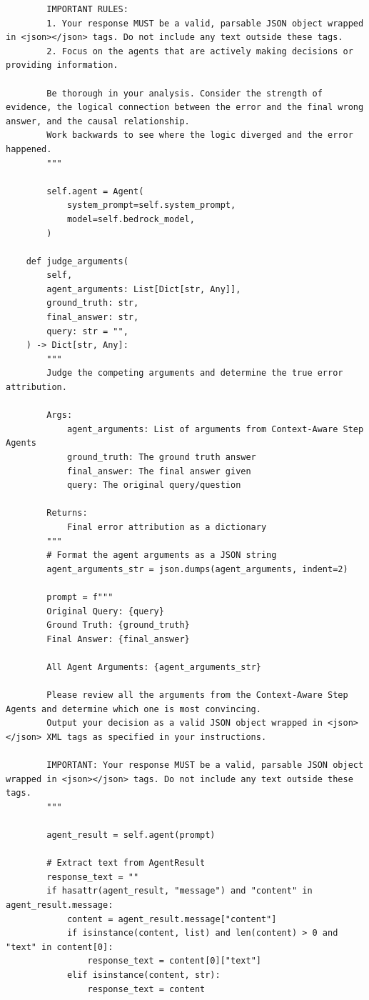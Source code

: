 \documentclass{article}
\begin{document}
\begin{lstlisting}
        IMPORTANT RULES:
        1. Your response MUST be a valid, parsable JSON object wrapped in <json></json> tags. Do not include any text outside these tags.
        2. Focus on the agents that are actively making decisions or providing information.
        
        Be thorough in your analysis. Consider the strength of evidence, the logical connection between the error and the final wrong answer, and the causal relationship.
        Work backwards to see where the logic diverged and the error happened.
        """

        self.agent = Agent(
            system_prompt=self.system_prompt,
            model=self.bedrock_model,
        )

    def judge_arguments(
        self,
        agent_arguments: List[Dict[str, Any]],
        ground_truth: str,
        final_answer: str,
        query: str = "",
    ) -> Dict[str, Any]:
        """
        Judge the competing arguments and determine the true error attribution.

        Args:
            agent_arguments: List of arguments from Context-Aware Step Agents
            ground_truth: The ground truth answer
            final_answer: The final answer given
            query: The original query/question

        Returns:
            Final error attribution as a dictionary
        """
        # Format the agent arguments as a JSON string
        agent_arguments_str = json.dumps(agent_arguments, indent=2)

        prompt = f"""
        Original Query: {query}
        Ground Truth: {ground_truth}
        Final Answer: {final_answer}
        
        All Agent Arguments: {agent_arguments_str}
        
        Please review all the arguments from the Context-Aware Step Agents and determine which one is most convincing.
        Output your decision as a valid JSON object wrapped in <json></json> XML tags as specified in your instructions.
        
        IMPORTANT: Your response MUST be a valid, parsable JSON object wrapped in <json></json> tags. Do not include any text outside these tags.
        """

        agent_result = self.agent(prompt)

        # Extract text from AgentResult
        response_text = ""
        if hasattr(agent_result, "message") and "content" in agent_result.message:
            content = agent_result.message["content"]
            if isinstance(content, list) and len(content) > 0 and "text" in content[0]:
                response_text = content[0]["text"]
            elif isinstance(content, str):
                response_text = content


\end{lstlisting}
\end{document}

